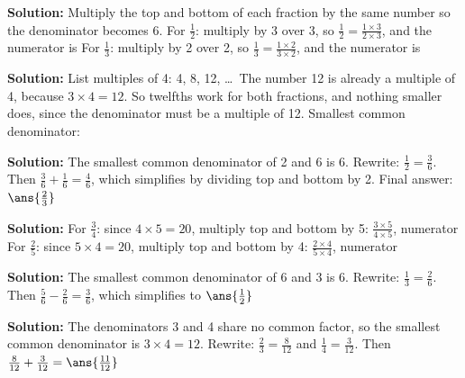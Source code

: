 \documentclass[12pt]{article}
\begin{document}



\textbf{Solution:} Multiply the top and bottom of each fraction by the same
number so the denominator becomes 6.
For $\tfrac{1}{2}$: multiply by 3 over 3, so
$\tfrac{1}{2} = \tfrac{1 \times 3}{2 \times 3}$, and the numerator is 
For $\tfrac{1}{3}$: multiply by 2 over 2, so
$\tfrac{1}{3} = \tfrac{1 \times 2}{3 \times 2}$, and the numerator is 


\textbf{Solution:} List multiples of 4: 4, 8, 12, \ldots\ The number 12 is
already a multiple of 4, because $3 \times 4 = 12$. So twelfths work for both
fractions, and nothing smaller does, since the denominator must be a multiple
of 12. Smallest common denominator: 


\textbf{Solution:} The smallest common denominator of 2 and 6 is 6.
Rewrite: $\tfrac{1}{2} = \tfrac{3}{6}$. Then
$\tfrac{3}{6} + \tfrac{1}{6} = \tfrac{4}{6}$, which simplifies by dividing top
and bottom by 2. Final answer: $\ans{\tfrac{2}{3}}$


\textbf{Solution:} For $\tfrac{3}{4}$: since $4 \times 5 = 20$, multiply top
and bottom by 5: $\tfrac{3 \times 5}{4 \times 5}$, numerator 
For $\tfrac{2}{5}$: since $5 \times 4 = 20$, multiply top and bottom by 4:
$\tfrac{2 \times 4}{5 \times 4}$, numerator 


\textbf{Solution:} The smallest common denominator of 6 and 3 is 6.
Rewrite: $\tfrac{1}{3} = \tfrac{2}{6}$. Then
$\tfrac{5}{6} - \tfrac{2}{6} = \tfrac{3}{6}$, which simplifies to
$\ans{\tfrac{1}{2}}$


\textbf{Solution:} The denominators 3 and 4 share no common factor, so the
smallest common denominator is $3 \times 4 = 12$.
Rewrite: $\tfrac{2}{3} = \tfrac{8}{12}$ and $\tfrac{1}{4} = \tfrac{3}{12}$.
Then $\tfrac{8}{12} + \tfrac{3}{12} = \ans{\tfrac{11}{12}}$
\end{document}
